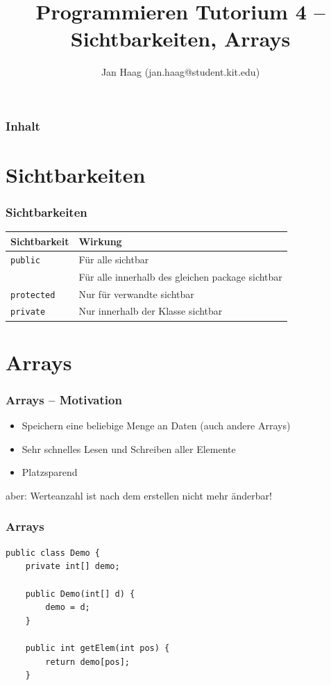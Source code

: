 \documentclass{beamer}
\author{Jan Haag (jan.haag@student.kit.edu)}
\title{Programmieren Tutorium 4 -- Sichtbarkeiten, Arrays}
\institute{Institut f\"{u}r Zeritfizierbare und Vertra\"{u}nsw\"{u}rdige Informatiksysteme (ZVI)}
\begin{document}
\begin{frame}
\maketitle
\end{frame}

\begin{frame}
\frametitle{Inhalt}
\tableofcontents
\end{frame}

\section{Sichtbarkeiten}
\begin{frame}[fragile]
\frametitle{Sichtbarkeiten}
\begin{tabular}{l|l}
Sichtbarkeit & Wirkung\\
\hline
\verb|public| & F\"{u}r alle sichtbar\\
 & F\"{u}r alle innerhalb des gleichen package sichtbar\\
\verb|protected| & Nur f\"{u}r \glqq{}verwandte\grqq{} sichtbar\\
\verb|private| & Nur innerhalb der Klasse sichtbar\\
\end{tabular}
\end{frame}

\section{Arrays}
\begin{frame}
\frametitle{Arrays -- Motivation}
\begin{itemize}
\item Speichern eine beliebige Menge an Daten (auch andere Arrays)
\item Sehr schnelles Lesen und Schreiben aller Elemente
\item Platzsparend
\end{itemize}
\pause
aber: Werteanzahl ist nach dem erstellen nicht mehr \"{a}nderbar!
\end{frame}

\begin{frame}[fragile]
\frametitle{Arrays}
\begin{verbatim}
public class Demo {
    private int[] demo;

    public Demo(int[] d) {
        demo = d;
    }

    public int getElem(int pos) {
        return demo[pos];
    }
\end{verbatim}
\end{frame}
\end{document}
